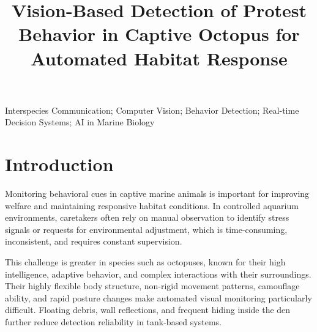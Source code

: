 \documentclass[conference]{IEEEtran}
\begin{document}
\title{Vision-Based Detection of Protest Behavior in Captive Octopus for Automated Habitat Response}

\author{





}
\maketitle


\begin{IEEEkeywords}
Interspecies Communication; Computer Vision; Behavior Detection; Real-time Decision Systems; AI in Marine Biology
\end{IEEEkeywords}

\section{Introduction}
Monitoring behavioral cues in captive marine animals is important for improving welfare and maintaining responsive habitat conditions. In controlled aquarium environments, caretakers often rely on manual observation to identify stress signals or requests for environmental adjustment, which is time-consuming, inconsistent, and requires constant supervision. 

This challenge is greater in species such as octopuses, known for their high intelligence, adaptive behavior, and complex interactions with their surroundings. Their highly flexible body structure, non-rigid movement patterns, camouflage ability, and rapid posture changes make automated visual monitoring particularly difficult. Floating debris, wall reflections, and frequent hiding inside the den further reduce detection reliability in tank-based systems.
\end{document}
